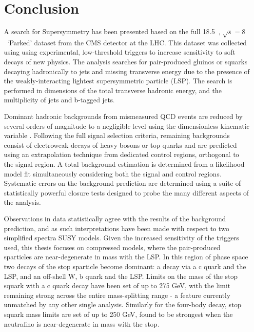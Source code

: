 \chapter{Conclusion}
\label{ch:conclusion}

\ifpdf
    \graphicspath{{Chapter10/Figs/Raster/}{Chapter10/Figs/PDF/}{Chapter10/Figs/}}
\else
    \graphicspath{{Chapter10/Figs/Vector/}{Chapter10/Figs/}}
\fi

A search for Supersymmetry has been presented based on the full 18.5~\fb, 
$\sqrt{s} = 8$~\tev `Parked' dataset from the CMS detector at the LHC.
This dataset was collected using
using experimental, low-threshold triggers to increase sensitivity to soft
decays of new physics. The
analysis searches for pair-produced gluinos or squarks decaying hadronically to
jets and missing transverse energy due to the presence of the weakly-interacting
lightest supersymmetric particle (LSP). The search is performed in dimensions of
the total transverse hadronic energy, and the multiplicity of jets and b-tagged
jets.

Dominant hadronic backgrounds from mismeasured QCD events are reduced by
several orders of magnitude to a negligible level using the dimensionless
kinematic variable \alphat. Following the full signal selection criteria,
remaining backgrounds consist of electroweak decays of
heavy bosons or top quarks and are predicted using an extrapolation technique
from dedicated control regions,
orthogonal to the signal region. A total background estimation is determined
from a likelihood model fit simultaneously considering both the signal and
control regions. Systematic errors on the background prediction are determined
using a suite of statistically powerful closure tests designed to probe the
many different aspects of the analysis.

Observations in data statistically agree with the results of the background
prediction, and as such interpretations have been made with respect to two
simplified spectra SUSY models. Given the increased sensitivity of the triggers
used, this thesis focuses on compressed models, where
the pair-produced sparticles are near-degenerate in mass with the LSP. In this
region of
phase space two decays of the stop sparticle become dominant: a
decay via a c quark and the LSP, and an off-shell W, b quark and the LSP.
Limits on the mass of the stop squark with a c quark decay have been set
of up to 275 GeV, with the limit remaining strong across the entire
mass-splitting
range - a feature currently unmatched by any other single analysis. Similarly
for the four-body decay, stop squark mass limits are set of up to 250 GeV, found
to be strongest when the neutralino is near-degenerate in mass with the stop.

